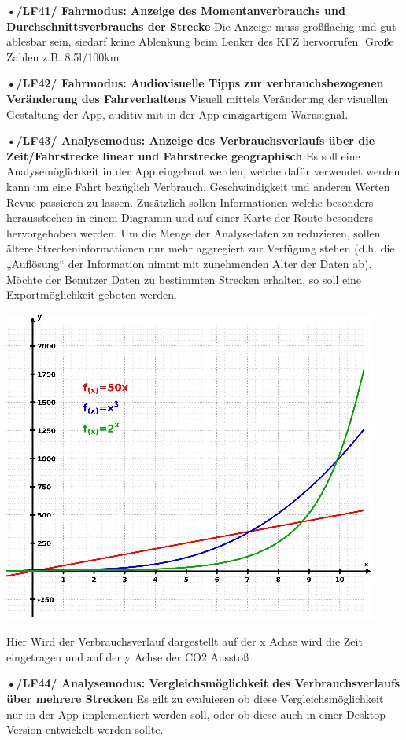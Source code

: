 \textbf{•/LF41/ Fahrmodus: Anzeige des Momentanverbrauchs und Durchschnittsverbrauchs der Strecke}
Die Anzeige muss großflächig und gut ablesbar sein, siedarf  keine Ablenkung beim Lenker des KFZ hervorrufen. 
Große Zahlen    z.B.  \Huge{8.5l/100km }

\textbf{•/LF42/ Fahrmodus: Audiovisuelle Tipps zur verbrauchsbezogenen Veränderung des Fahrverhaltens}
Visuell mittels Veränderung der visuellen Gestaltung der App, auditiv mit in der App einzigartigem Warnsignal.

\textbf{•/LF43/ Analysemodus: Anzeige des Verbrauchsverlaufs über die Zeit/Fahrstrecke linear und Fahrstrecke geographisch}
Es soll eine Analysemöglichkeit in der App eingebaut werden, welche dafür verwendet werden kann um eine Fahrt bezüglich Verbrauch, Geschwindigkeit und anderen Werten Revue passieren zu lassen. Zusätzlich sollen Informationen welche besonders herausstechen in einem Diagramm und auf einer Karte der Route besonders hervorgehoben werden. Um die Menge der Analysedaten zu reduzieren, sollen ältere Streckeninformationen nur mehr aggregiert zur Verfügung stehen (d.h. die „Auflösung“ der Information nimmt mit zunehmenden Alter der Daten ab). Möchte der Benutzer Daten zu bestimmten Strecken erhalten, so soll eine Exportmöglichkeit geboten werden.

\includegraphics[scale=0.5]{images/LF43_Diagramm.jpg}

Hier Wird der Verbrauchsverlauf dargestellt auf der x Achse wird die Zeit eingetragen und auf der y Achse der CO2 Ausstoß

\textbf{•/LF44/ Analysemodus: Vergleichsmöglichkeit des Verbrauchsverlaufs über mehrere Strecken}
Es gilt zu evaluieren ob diese Vergleichsmöglichkeit nur in der App implementiert werden soll, oder ob diese auch in einer Desktop Version entwickelt werden sollte.

